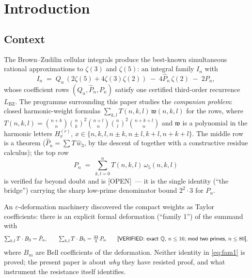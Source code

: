 \documentclass[11pt,reqno]{amsart}
\theoremstyle{plain}
\theoremstyle{definition}
\theoremstyle{remark}
\newcommand{\Q}{\mathbb{Q}}
\newcommand{\bin}[2]{\binom{#1}{#2}}
\newcommand{\HH}[2]{H^{(#1)}_{#2}}
\newcommand{\Lbz}{L_{\mathrm{BZ}}}
\newcommand{\VerifiedR}[1]{\textup{\textsf{[VERIFIED: #1]}}}
\newcommand{\Open}{\textup{\textsf{[OPEN]}}}
\begin{document}
\section{Introduction}\label{sec:intro}

\subsection{Context}
The Brown--Zudilin cellular integrals \cite{BZ22} produce the best-known
simultaneous rational approximations to $\zeta(3)$ and $\zeta(5)$: an integral
family $I_n$ with
\begin{equation}\label{eq:In}
I_n \;=\; Q_n\,(2\zeta(5)+4\zeta(3)\zeta(2)) \;-\; 4\hat P_n\,\zeta(2)
\;-\;2P_n,
\end{equation}
whose coefficient rows $(Q_n,\hat P_n,P_n)$ satisfy one certified third-order
recurrence $\Lbz$. The programme surrounding this paper studies the
\emph{companion problem}: closed harmonic-weight formulas
$\sum_{k,l}T(n,k,l)\,\mathfrak w(n,k,l)$ for the rows, where
$T(n,k,l)=\bin{n+k}{n}\bin nk^2\bin{n+l}{n}\bin nl^2\bin{n+k+l}{n}$ and
$\mathfrak w$ is a polynomial in the harmonic letters
$\HH r{x}$, $x\in\{n,k,l,n\pm k,n\pm l,k+l,n+k+l\}$. The middle row is a
theorem ($\hat P_n=\sum T\,\hat w_3$, by the descent of \cite{BZ22} together
with a constructive residue calculus); the top row
\begin{equation}\label{eq:bridge}
P_n\;=\;\sum_{k,l=0}^{n}T(n,k,l)\,\omega_5(n,k,l)
\end{equation}
is verified far beyond doubt and is \Open\ --- it is the single identity
(``the bridge'') carrying the sharp low-prime denominator bound
$2^2\cdot3$ for $P_n$.

An $\varepsilon$-deformation machinery discovered the compact weights as
Taylor coefficients: there is an explicit formal deformation (``family 1'')
of the summand with
\begin{equation}\label{eq:fam1}
\textstyle\sum_{k,l}T\cdot B_3=\hat P_n,\qquad
\sum_{k,l}T\cdot B_5=\tfrac{33}4\,P_n
\qquad\VerifiedR{exact $\Q$, $n\le16$; mod two primes, $n\le80$},
\end{equation}
where $B_m$ are Bell coefficients of the deformation. Neither identity in
\eqref{eq:fam1} is proved; the present paper is about \emph{why} they have
resisted proof, and what instrument the resistance itself identifies.
\end{document}
